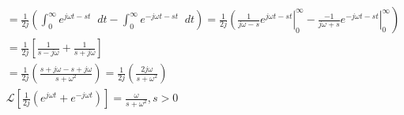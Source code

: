 \documentclass[12pt]{article}
\newenvironment{problem}[2][Problem]{\begin{trivlist}
		\item[\hskip \labelsep {\bfseries #1}\hskip \labelsep {\bfseries #2.}]}{\end{trivlist}}
\newcommand\diff{\mathop{}\!d}
\begin{document}
\begin{problem}{1 (A) --- Laplace Transforms}
\begin{enumerate}[i)]
\begin{align*}
		& = \frac{1}{2j} \left(\int_{0}^{\infty}e^{j\omega t -st} \diff t - \int_{0}^{\infty}e^{-j\omega t-st} \diff t \right) =  \frac{1}{2j} \left.  \left(\frac{1}{j\omega -s}e^{j\omega t -st} \right|_{0}^{\infty} -\left. \frac{-1}{j\omega +s}   e^{-j\omega t -st} \right|_{0}^{\infty} \right) \\
		&= \frac{1}{2j} \left[\frac{1}{s-j\omega}+\frac{1}{s+j\omega}\right] \\
		&=\frac{1}{2j}\left(\frac{s+j\omega -s +j\omega}{s+\omega^2}\right)= \frac{1}{2j}\left(\frac{2j\omega}{s+\omega^2}\right) \\
		& \boxed {\mathscr{L} \left[\frac{1}{2j}\left( e^{j\omega t}+ e^{-j\omega t}\right)\right] = \frac{\omega}{s+\omega^2}, s > 0}
		\end{align*}
	\end{enumerate}
\end{problem}
\end{document}
